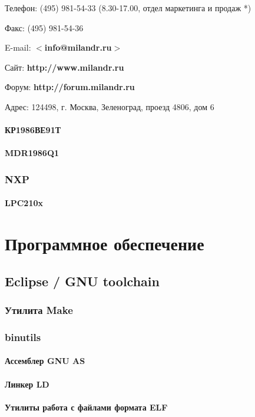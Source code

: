 \documentclass[oneside,12pt]{book}
\renewcommand{\url}[1]{\textbf{#1}}
\newcommand{\email}[1]{$<$\textbf{#1}$>$}
\begin{document}
\bigskip

Телефон: (495) 981-54-33 (8.30-17.00, отдел маркетинга и продаж *)

Факс: (495) 981-54-36

E-mail: \email{info@milandr.ru}

Сайт: \url{http://www.milandr.ru}

Форум: \url{http://forum.milandr.ru}

Адрес: 124498, г. Москва, Зеленоград, проезд 4806, дом 6

\subsection{КР1986ВЕ91Т}
\subsection{MDR1986Q1}
\section{NXP}
\subsection{LPC210x}

\part{Программное обеспечение}
\chapter{Eclipse / GNU toolchain}
\section{Утилита Make}
\section{binutils}
\subsection{Ассемблер GNU AS}
\subsection{Линкер LD}
\subsection{Утилиты работа с файлами формата ELF}
\end{document}

